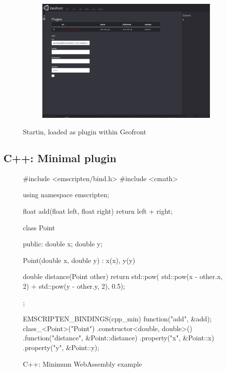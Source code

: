 \begin{figure}
\begin{subfigure}[b]{0.90\linewidth}
    \includegraphics[width=\linewidth]{2.PNG}
  \end{subfigure}%
  \caption[Types of \ac{vpl}s]{Startin, loaded as plugin within Geofront}%
  \label{fig:startin-plugin}
  \end{figure}

\subsection{C++: Minimal plugin}  

\begin{figure}
\centering
\begin{code}
#include <emscripten/bind.h>
#include <cmath>

using namespace emscripten;

float add(float left, float right) {
    return left + right;
}

class Point {
public:
    double x;
    double y;

    Point(double x, double y) :
        x(x),
        y(y) {}

    double distance(Point other) {
        return std::pow(
            std::pow(x - other.x, 2) + std::pow(y - other.y, 2), 
            0.5);
    }
};

EMSCRIPTEN_BINDINGS(cpp_min) {
    function("add", &add);
    class_<Point>("Point")
        .constructor<double, double>()
        .function("distance", &Point::distance)
        .property("x", &Point::x)
        .property("y", &Point::y);
}
\end{code}
\caption{C++: Minimum WebAssembly example}
\label{fig:minimum-cpp-wasm}
\end{figure}



